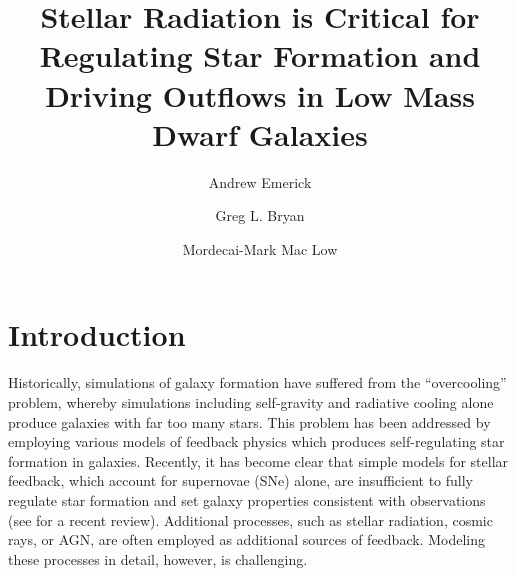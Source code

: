 \documentclass[twocolumn]{aastex62}
\begin{document}
\title{Stellar Radiation is Critical for Regulating Star Formation and Driving Outflows in Low Mass Dwarf Galaxies}


\author{Andrew Emerick}

\author{Greg L. Bryan}

\author{Mordecai-Mark Mac Low}
\nocollaboration

\begin{abstract}
\end{abstract}


\section{Introduction} \label{sec:intro}
Historically, simulations of galaxy formation have suffered from the ``overcooling'' problem, whereby simulations including self-gravity and radiative cooling alone produce galaxies with far too many stars. This problem has been addressed by employing various models of feedback physics which produces self-regulating star formation in galaxies. Recently, it has become clear that simple models for stellar feedback, which account for supernovae (SNe) alone, are insufficient to fully regulate star formation and set galaxy properties consistent with observations (see \cite{NaabOstriker2017} for a recent review). Additional processes, such as stellar radiation, cosmic rays, or AGN, are often employed as additional sources of feedback. Modeling these processes in detail, however, is challenging.
\end{document}
